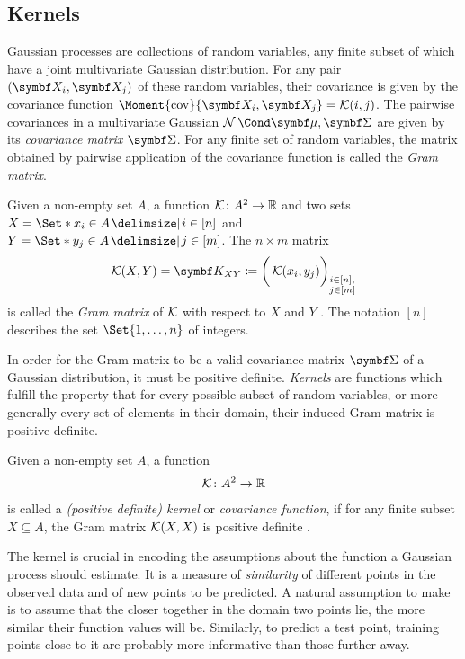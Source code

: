 \subsection{Kernels}
Gaussian processes are collections of random variables, any finite subset of which have a joint multivariate Gaussian distribution.
For any pair $(\rv{X_i}, \mat{X_j})$ of these random variables, their covariance is given by the covariance function $\Moment{\cov}{\rv{X_i}, \rv{X_j}} = \K(i, j)$.
The pairwise covariances in a multivariate Gaussian $\Gaussian{\mat{\mu}, \mat{\Sigma}}$ are given by its \emph{covariance matrix} $\mat{\Sigma}$.
For any finite set of random variables, the matrix obtained by pairwise application of the covariance function is called the \emph{Gram matrix}.
\begin{definition}
    Given a non-empty set $A$, a function $\operatorname{\mathcal{K}} \colon A^2 \to \mathbb{R}$ and two sets $X = \Set*{x_i \in A \with i \in [n]}$ and $Y = \Set*{y_j \in A \with j \in [m]}$.
    The $n \times m$ matrix
    \begin{align}
        \K(X, Y) = \mat{K_{XY}} \coloneqq \bigg( \K(x_i, y_j) \bigg)_{\substack{i \in [n], \\ j \in [m]}}
    \end{align}
    is called the \emph{Gram matrix} of $\operatorname{\mathcal{K}}$ with respect to $X$ and $Y$ \cite{scholkopf_learning_2002}.
    The notation $[n]$ describes the set $\Set{1, \dots, n}$ of integers.
\end{definition}
In order for the Gram matrix to be a valid covariance matrix $\mat{\Sigma}$ of a Gaussian distribution, it must be positive definite.
\emph{Kernels} are functions which fulfill the property that for every possible subset of random variables, or more generally every set of elements in their domain, their induced Gram matrix is positive definite.
\begin{definition}[Kernel]
    Given a non-empty set $A$, a function
    \begin{align}
        \operatorname{\mathcal{K}} \colon A^2 \to \mathbb{R}
    \end{align}
    is called a \emph{(positive definite) kernel} or \emph{covariance function}, if for any finite subset $X \subseteq A$, the Gram matrix $\operatorname{\mathcal{K}}(X, X)$ is positive definite \cite{scholkopf_learning_2002}.
\end{definition}
The kernel is crucial in encoding the assumptions about the function a Gaussian process should estimate.
It is a measure of \emph{similarity} of different points in the observed data and of new points to be predicted.
A natural assumption to make is to assume that the closer together in the domain two points lie, the more similar their function values will be.
Similarly, to predict a test point, training points close to it are probably more informative than those further away.


